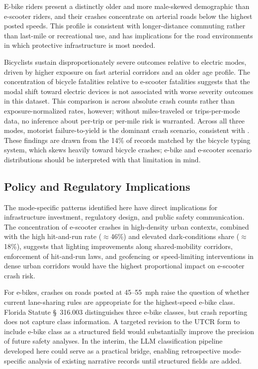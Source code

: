 \documentclass[numbered]{trbunofficial}
\begin{document}
E-bike riders present a distinctly older and more male-skewed demographic than e-scooter riders, and their crashes concentrate on arterial roads below the highest posted speeds. This profile is consistent with longer-distance commuting rather than last-mile or recreational use, and has implications for the road environments in which protective infrastructure is most needed.

Bicyclists sustain disproportionately severe outcomes relative to electric modes, driven by higher exposure on fast arterial corridors and an older age profile. The concentration of bicycle fatalities relative to e-scooter fatalities suggests that the modal shift toward electric devices is not associated with worse severity outcomes in this dataset. This comparison is across absolute crash counts rather than exposure-normalized rates, however; without miles-traveled or trips-per-mode data, no inference about per-trip or per-mile risk is warranted. Across all three modes, motorist failure-to-yield is the dominant crash scenario, consistent with \citet{Shah2021}. These findings are drawn from the 14\% of records matched by the bicycle typing system, which skews heavily toward bicycle crashes; e-bike and e-scooter scenario distributions should be interpreted with that limitation in mind.

\subsection{Policy and Regulatory Implications}

The mode-specific patterns identified here have direct implications for infrastructure investment, regulatory design, and public safety communication. The concentration of e-scooter crashes in high-density urban contexts, combined with the high hit-and-run rate ($\approx$46\%) and elevated dark-conditions share ($\approx$18\%), suggests that lighting improvements along shared-mobility corridors, enforcement of hit-and-run laws, and geofencing or speed-limiting interventions in dense urban corridors would have the highest proportional impact on e-scooter crash risk.

For e-bikes, crashes on roads posted at 45--55~mph raise the question of whether current lane-sharing rules are appropriate for the highest-speed e-bike class. Florida Statute \S~316.003 distinguishes three e-bike classes, but crash reporting does not capture class information. A targeted revision to the UTCR form to include e-bike class as a structured field would substantially improve the precision of future safety analyses. In the interim, the LLM classification pipeline developed here could serve as a practical bridge, enabling retrospective mode-specific analysis of existing narrative records until structured fields are added.
\end{document}
